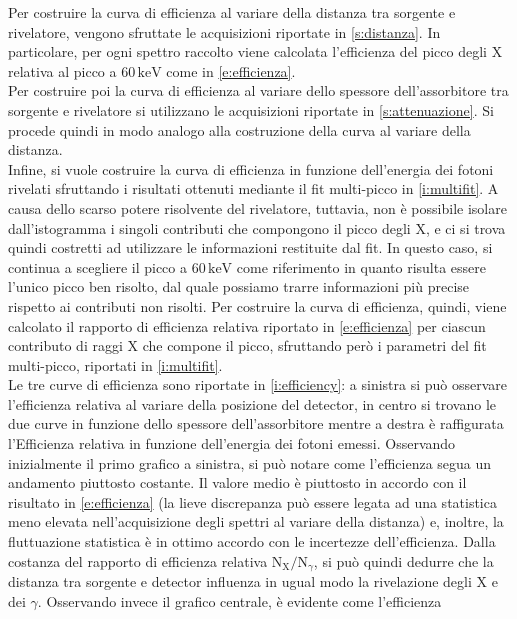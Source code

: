 \documentclass[twocolumn,10pt]{asme2ej}
\begin{document}
Per costruire la curva di efficienza al variare della distanza tra sorgente e rivelatore, vengono sfruttate le
acquisizioni riportate in \autoref{s:distanza}. In particolare, per ogni spettro raccolto viene calcolata l'efficienza
del picco degli X relativa al picco a $60\,\si{\kilo\electronvolt}$ come in \autoref{e:efficienza}. \\
Per costruire poi la curva di efficienza al variare dello spessore dell'assorbitore tra sorgente e rivelatore si
utilizzano le acquisizioni riportate in \autoref{s:attenuazione}. Si procede quindi in modo analogo alla costruzione
della curva al variare della distanza. \\
Infine, si vuole costruire la curva di efficienza in funzione dell'energia dei fotoni rivelati sfruttando  i risultati
ottenuti mediante il fit multi-picco in \autoref{i:multifit}. A causa dello scarso potere risolvente del rivelatore,
tuttavia, non è possibile isolare dall'istogramma i singoli contributi che compongono il picco degli X, e ci si trova
quindi costretti ad utilizzare le informazioni restituite dal fit. In questo caso, si continua a scegliere il picco a
$60\,\si{\kilo\electronvolt}$ come riferimento in quanto risulta essere l'unico picco ben risolto, dal quale possiamo
trarre informazioni più precise rispetto ai contributi non risolti. Per costruire la curva di efficienza, quindi, viene
calcolato il rapporto di efficienza relativa riportato in \autoref{e:efficienza} per ciascun contributo di raggi X che
compone il picco, sfruttando però i parametri del fit multi-picco, riportati in \autoref{i:multifit}. \\
Le tre curve di efficienza sono riportate in \autoref{i:efficiency}: a sinistra si può osservare l'efficienza relativa
al variare della posizione del detector, in centro si trovano le due curve in funzione dello spessore dell'assorbitore
mentre a destra è raffigurata l'Efficienza relativa in funzione dell'energia dei fotoni emessi. Osservando inizialmente
il primo grafico a sinistra, si può notare come l'efficienza segua un andamento piuttosto costante. Il valore medio è
piuttosto in accordo con il risultato in \autoref{e:efficienza} (la lieve discrepanza può essere legata ad una
statistica meno elevata nell'acquisizione degli spettri al variare della distanza) e, inoltre, la fluttuazione
statistica è in ottimo accordo con le incertezze dell'efficienza. Dalla costanza del rapporto di efficienza relativa
$\text{N}_{\text{X}}/\text{N}_{\gamma}$, si può quindi dedurre che la distanza tra sorgente e detector influenza in
ugual modo la rivelazione degli X e dei $\gamma$. Osservando invece il grafico centrale, è evidente come l'efficienza
\end{document}

